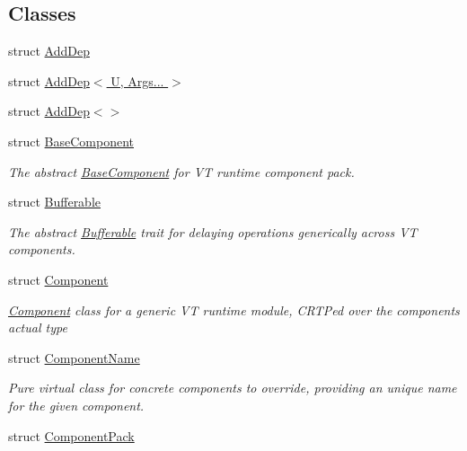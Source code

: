 \subsection*{Classes}
\begin{DoxyCompactItemize}
\item 
struct \hyperlink{structvt_1_1runtime_1_1component_1_1_add_dep}{Add\+Dep}
\item 
struct \hyperlink{structvt_1_1runtime_1_1component_1_1_add_dep_3_01_u_00_01_args_8_8_8_01_4}{Add\+Dep$<$ U, Args... $>$}
\item 
struct \hyperlink{structvt_1_1runtime_1_1component_1_1_add_dep_3_4}{Add\+Dep$<$$>$}
\item 
struct \hyperlink{structvt_1_1runtime_1_1component_1_1_base_component}{Base\+Component}
\begin{DoxyCompactList}\small\item\em The abstract {\ttfamily \hyperlink{structvt_1_1runtime_1_1component_1_1_base_component}{Base\+Component}} for VT runtime component pack. \end{DoxyCompactList}\item 
struct \hyperlink{structvt_1_1runtime_1_1component_1_1_bufferable}{Bufferable}
\begin{DoxyCompactList}\small\item\em The abstract {\ttfamily \hyperlink{structvt_1_1runtime_1_1component_1_1_bufferable}{Bufferable}} trait for delaying operations generically across VT components. \end{DoxyCompactList}\item 
struct \hyperlink{structvt_1_1runtime_1_1component_1_1_component}{Component}
\begin{DoxyCompactList}\small\item\em {\ttfamily \hyperlink{structvt_1_1runtime_1_1component_1_1_component}{Component}} class for a generic VT runtime module, C\+R\+TP\textquotesingle{}ed over the component\textquotesingle{}s actual type \end{DoxyCompactList}\item 
struct \hyperlink{structvt_1_1runtime_1_1component_1_1_component_name}{Component\+Name}
\begin{DoxyCompactList}\small\item\em Pure virtual class for concrete components to override, providing an unique name for the given component. \end{DoxyCompactList}\item 
struct \hyperlink{structvt_1_1runtime_1_1component_1_1_component_pack}{Component\+Pack}

\end{DoxyCompactItemize}
